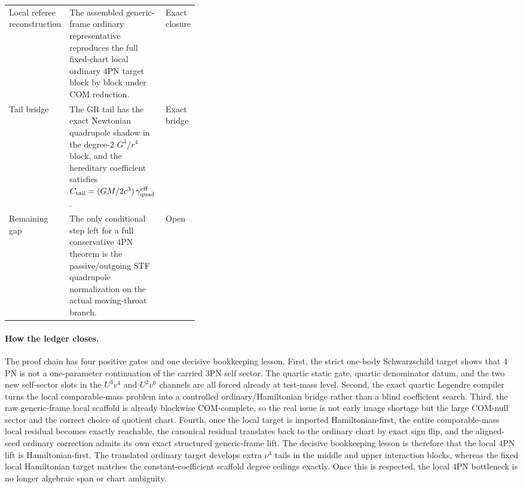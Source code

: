 \documentclass[11pt]{article}
\begin{document}
\begin{table}[t]
\begin{tabularx}{\linewidth}{@{}p{0.22\linewidth}L p{0.15\linewidth}@{}}
    Local referee reconstruction
    & The assembled generic-frame ordinary representative reproduces the full
      fixed-chart local ordinary $4$PN target block by block under COM
      reduction.
    & Exact closure \\

    Tail bridge
    & The GR tail has the exact Newtonian quadrupole shadow in the degree-$2$
      $G^4/r^4$ block, and the hereditary coefficient satisfies
      $C_{\rm tail}=(GM/2c^3)\,\gamma_{\rm quad}^{\rm eff}$.
    & Exact bridge \\

    Remaining gap
    & The only conditional step left for a full conservative $4$PN theorem is
      the passive/outgoing STF quadrupole normalization on the actual
      moving-throat branch.
    & Open \\
    \bottomrule
  \end{tabularx}
\end{table}

\paragraph{How the ledger closes.}
The proof chain has four positive gates and one decisive bookkeeping lesson.
First, the strict one-body Schwarzschild target shows that $4$PN is not a
one-parameter continuation of the carried $3$PN self sector.  The quartic static
gate, quartic denominator datum, and the two new self-sector slots in the
$U^3v^4$ and $U^2v^6$ channels are all forced already at test-mass level.
Second, the exact quartic Legendre compiler turns the local comparable-mass
problem into a controlled ordinary/Hamiltonian bridge rather than a blind
coefficient search.  Third, the raw generic-frame local scaffold is already
blockwise COM-complete, so the real issue is not early image shortage but the
large COM-null sector and the correct choice of quotient chart.  Fourth, once
the local target is imported Hamiltonian-first, the entire comparable-mass local
residual becomes exactly reachable, the canonical residual translates back to
the ordinary chart by exact sign flip, and the aligned-seed ordinary correction
admits its own exact structured generic-frame lift.  The decisive bookkeeping
lesson is therefore that the local $4$PN lift is Hamiltonian-first.  The
translated ordinary target develops extra $\nu^4$ tails in the middle and upper
interaction blocks, whereas the fixed local Hamiltonian target matches the
constant-coefficient scaffold degree ceilings exactly.  Once this is respected,
the local $4$PN bottleneck is no longer algebraic span or chart ambiguity.
\end{document}
